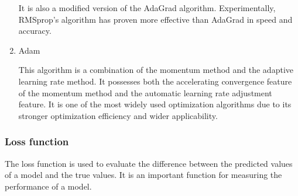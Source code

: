 \documentclass[10pt,journal,compsoc]{IEEEtran}
\begin{document}
\begin{enumerate}
It is also a modified version of the AdaGrad algorithm. Experimentally, RMSprop's algorithm has proven more effective than AdaGrad in speed and accuracy.

    \item Adam \cite{13}

This algorithm is a combination of the momentum method and the adaptive learning rate method. It possesses both the accelerating convergence feature of the momentum method and the automatic learning rate adjustment feature. It is one of the most widely used optimization algorithms due to its stronger optimization efficiency and wider applicability.

\end{enumerate}

\subsubsection{Loss function}

The loss function is used to evaluate the difference between the predicted values of a model and the true values. It is an important function for measuring the performance of a model. 
\end{document}
